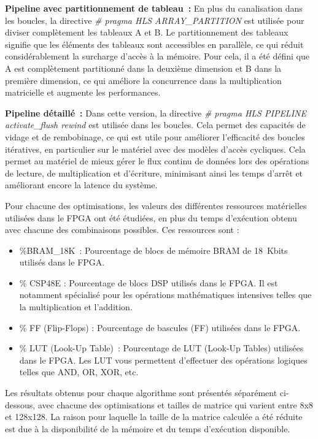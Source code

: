 \documentclass[../CSC_5RO06_TA.tex]{subfiles}
\begin{document}
\textbf{Pipeline avec partitionnement de tableau :}  En plus du canalisation dans les boucles, la directive \textit{\# pragma HLS ARRAY\_PARTITION} est utilisée pour diviser complètement les tableaux A et B. Le partitionnement des tableaux signifie que les éléments des tableaux sont accessibles en parallèle, ce qui réduit considérablement la surcharge d'accès à la mémoire. Pour cela, il a été défini que A est complètement partitionné dans la deuxième dimension et B dans la première dimension, ce qui améliore la concurrence dans la multiplication matricielle et augmente les performances.

\textbf{ Pipeline détaillé :}  Dans cette version, la directive \textit{\# pragma HLS PIPELINE activate\_flush rewind} est utilisée dans les boucles. Cela permet des capacités de vidage et de rembobinage, ce qui est utile pour améliorer l'efficacité des boucles itératives, en particulier sur le matériel avec des modèles d'accès cycliques. Cela permet au matériel de mieux gérer le flux continu de données lors des opérations de lecture, de multiplication et d'écriture, minimisant ainsi les temps d'arrêt et améliorant encore la latence du système.


Pour chacune des optimisations, les valeurs des différentes ressources matérielles utilisées dans le FPGA ont été étudiées, en plus du temps d'exécution obtenu avec chacune des combinaisons possibles. Ces ressources sont :

\begin{itemize}
    \item \%BRAM\_18K : Pourcentage de blocs de mémoire BRAM de 18 Kbits utilisés dans le FPGA.
    
    \item \% CSP48E : Pourcentage de blocs DSP utilisés dans le FPGA. Il est notamment spécialisé pour les opérations mathématiques intensives telles que la multiplication et l'addition.
    
    \item \% FF (Flip-Flops) : Pourcentage de bascules (FF) utilisées dans le FPGA.
    
    \item \% LUT (Look-Up Table) : Pourcentage de LUT (Look-Up Tables) utilisées dans le FPGA. Les LUT vous permettent d'effectuer des opérations logiques telles que AND, OR, XOR, etc.
\end{itemize}

Les résultats obtenus pour chaque algorithme sont présentés séparément ci-dessous, avec chacune des optimisations et tailles de matrice qui varient entre 8x8 et 128x128. La raison pour laquelle la taille de la matrice calculée a été réduite est due à la disponibilité de la mémoire et du temps d'exécution disponible.
\end{document}
